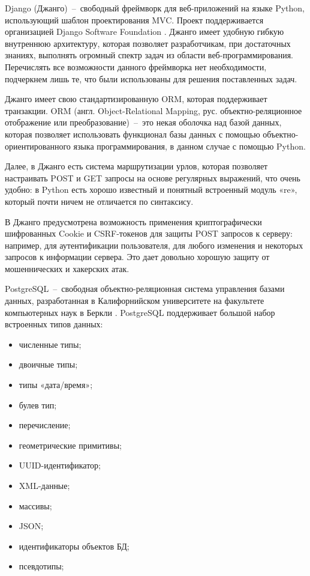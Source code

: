 Django (Джанго)~--~свободный фреймворк для веб-приложений на языке Python, использующий шаблон проектирования MVC.
Проект поддерживается организацией Django Software Foundation \cite{Django}. Джанго имеет удобную гибкую
внутреннюю архитектуру, которая позволяет разработчикам, при достаточных знаниях, выполнять огромный спектр задач
из области веб-программирования. Перечислять все возможности данного фреймворка нет необходимости, подчеркнем лишь те,
что были использованы для решения поставленных задач.

Джанго имеет свою стандартизированную ORM, которая поддерживает транзакции. ORM (англ. Object-Relational Mapping,
рус. объектно-реляционное отображение или преобразование)~--~это некая оболочка над базой данных, которая позволяет
использовать функционал базы данных с помощью объектно-ориентированного языка программирования, в данном случае с помощью Python.

Далее, в Джанго есть система маршрутизации урлов, которая позволяет настраивать POST и GET запросы на основе регулярных выражений,
что очень удобно: в Python есть хорошо известный и понятный встроенный модуль «re», который почти ничем не отличается по синтаксису.

В Джанго предусмотрена возможность применения криптографически шифрованных Cookie и CSRF-токенов для защиты POST
запросов к серверу: например, для аутентификации пользователя, для любого изменения и некоторых запросов к информации сервера.
Это дает довольно хорошую защиту от мошеннических и хакерских атак.

PostgreSQL~--~свободная объектно-реляционная система управления базами данных, разработанная в Калифорнийском
университете на факультете компьютерных наук в Беркли \cite{PostgreSQL}. PostgreSQL поддерживает большой набор встроенных типов данных:
\begin{itemize}
\item численные типы;
\item двоичные типы;
\item типы «дата/время»;
\item булев тип;
\item перечисление;
\item геометрические примитивы;
\item UUID-идентификатор;
\item XML-данные;
\item массивы;
\item JSON;
\item идентификаторы объектов БД;
\item псевдотипы;
\end{itemize}

